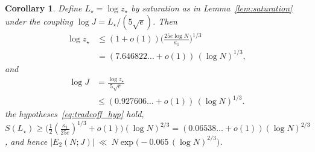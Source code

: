 \documentclass[11pt, a4paper]{article}
\theoremstyle{plain}
\newtheorem{corollary}[theorem]{Corollary}
\theoremstyle{definition}
\begin{document}
\begin{corollary}\label{cor:optimal_tradeoff}
Define $L_\star=\log z_\star$ by saturation as in Lemma~\ref{lem:saturation} under the coupling $\log J=L_\star/(5\sqrt{e})$. Then
\[
\begin{aligned}
\log z_\star
&\le (1+o(1))
     \Big(\frac{25e\log N}{\kappa_1}\Big)^{1/3} \\
&= (7.646822\ldots+o(1))\,(\log N)^{1/3},
\end{aligned}
\]
and
\[
\begin{aligned}
\log J
&= \frac{\log z_\star}{5\sqrt{e}} \\
&\le (0.927606\ldots+o(1))\,(\log N)^{1/3}.
\end{aligned}
\]
the hypotheses~\eqref{eq:tradeoff_hyp} hold, $S(L_\star)\ge\big(\frac12(\frac{\kappa_1}{25e})^{1/3}+o(1)\big)(\log N)^{2/3}=(0.06538\ldots+o(1))(\log N)^{2/3}$, and hence $|E_2(N;J)|\ \ll\ N\exp\big(-0.065\,(\log N)^{2/3}\big)$.
\end{corollary}
\end{document}

